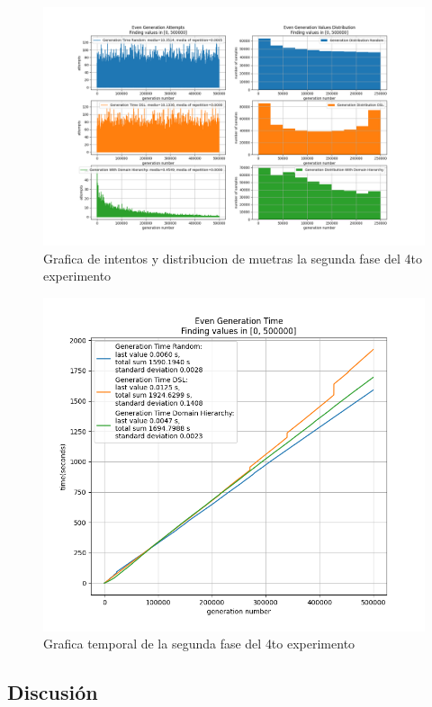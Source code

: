 \begin{figure}[!ht]
      \includegraphics[width=\linewidth]{Graphics/exp7.png}
      \caption{Grafica de intentos y distribucion de muetras la segunda fase del 4to experimento}
      \label{fig:exp7}
\end{figure}

\newpage

\begin{figure}[!ht]
      \includegraphics[width=\linewidth]{Graphics/exp6.png}
      \caption{Grafica temporal de la segunda fase del 4to experimento}
      \label{fig:exp6}
\end{figure}

\subsection{Discusión}

